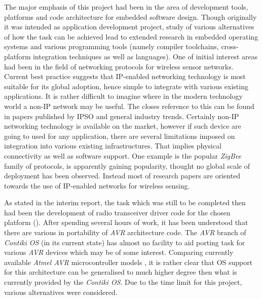 
  The major emphasis of this project had been in the area of development
 tools, platforms and code architecture for embedded software design.
 Though originally it was intended as application development project,
 study of various alternatives of how the task can be achieved lead to
 extended research in embedded operating systems and various programming
 tools (namely compiler toolchains, cross-platform integration techniques
 as well as languages).
  One of initial interest areas had been in the field of networking protocols
 for wireless sensor networks. Current best practice suggests that IP-enabled
 networking technology is most suitable for its global adoption, hence simple
 to integrate with various existing applications. It is rather difficult to
 imagine where in the modern technology world a non-IP network may be useful.%
 The closes reference to this can be found in papers published by IPSO 
 \cite{IPSO_PAPERS} and general industry trends. Certainly non-IP networking
 technology is available on the market, however if such device are going to
 used for any application, there are several limitations imposed on integration
 into various existing infrastructures. That implies physical connectivity
 as well as software support. One example is the popular \emph{ZigBee}
 family of protocols, is apparently gaining popularity, thought no global
 scale of deployment has been observed. Instead most of research papers
 are oriented towards the use of IP-enabled networks for wireless sensing.


  As stated in the interim report, the task which was still to be
 completed then had been the development of radio transceiver driver
 code for the chosen platform (). After spending
 several hours of work, it has been understood that there are various
 in portability of \emph{AVR} architecture code. The \emph{AVR} branch
 of \emph{Contiki OS} (in its current state) has almost no facility to
 aid porting task for various \emph{AVR} devices which may be of some
 interest. Comparing currently available \emph{Atmel AVR} microcontroller
 models \cite{atmel:avr:table}, it is rather clear that OS support for
 this architecture can be generalised to much higher degree then what is
 currently provided by the \emph{Contiki OS}. Due to the time limit for
 this project, various alternatives were considered.




